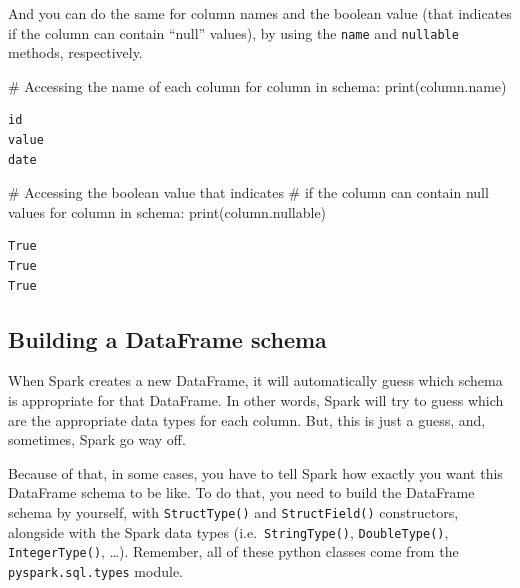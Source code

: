 \documentclass[
  11pt,
  letterpaper,
  DIV=11,
  numbers=noendperiod]{scrreprt}
\newenvironment{Shaded}{\begin{snugshade}}{\end{snugshade}}
\newcommand{\BuiltInTok}[1]{\textcolor[rgb]{0.00,0.23,0.31}{#1}}
\newcommand{\CommentTok}[1]{\textcolor[rgb]{0.37,0.37,0.37}{#1}}
\newcommand{\ControlFlowTok}[1]{\textcolor[rgb]{0.00,0.23,0.31}{#1}}
\newcommand{\KeywordTok}[1]{\textcolor[rgb]{0.00,0.23,0.31}{#1}}
\newcommand{\NormalTok}[1]{\textcolor[rgb]{0.00,0.23,0.31}{#1}}
\begin{document}
And you can do the same for column names and the boolean value (that
indicates if the column can contain ``null'' values), by using the
\texttt{name} and \texttt{nullable} methods, respectively.

\begin{Shaded}
\begin{Highlighting}[]
\CommentTok{\# Accessing the name of each column}
\ControlFlowTok{for}\NormalTok{ column }\KeywordTok{in}\NormalTok{ schema:}
  \BuiltInTok{print}\NormalTok{(column.name)}
\end{Highlighting}
\end{Shaded}

\begin{verbatim}
id
value
date
\end{verbatim}

\begin{Shaded}
\begin{Highlighting}[]
\CommentTok{\# Accessing the boolean value that indicates}
\CommentTok{\# if the column can contain null values}
\ControlFlowTok{for}\NormalTok{ column }\KeywordTok{in}\NormalTok{ schema:}
  \BuiltInTok{print}\NormalTok{(column.nullable)}
\end{Highlighting}
\end{Shaded}

\begin{verbatim}
True
True
True
\end{verbatim}

\hypertarget{building-a-dataframe-schema}{%
\subsection{Building a DataFrame
schema}\label{building-a-dataframe-schema}}

When Spark creates a new DataFrame, it will automatically guess which
schema is appropriate for that DataFrame. In other words, Spark will try
to guess which are the appropriate data types for each column. But, this
is just a guess, and, sometimes, Spark go way off.

Because of that, in some cases, you have to tell Spark how exactly you
want this DataFrame schema to be like. To do that, you need to build the
DataFrame schema by yourself, with \texttt{StructType()} and
\texttt{StructField()} constructors, alongside with the Spark data types
(i.e.~\texttt{StringType()}, \texttt{DoubleType()},
\texttt{IntegerType()}, \ldots). Remember, all of these python classes
come from the \texttt{pyspark.sql.types} module.
\end{document}
